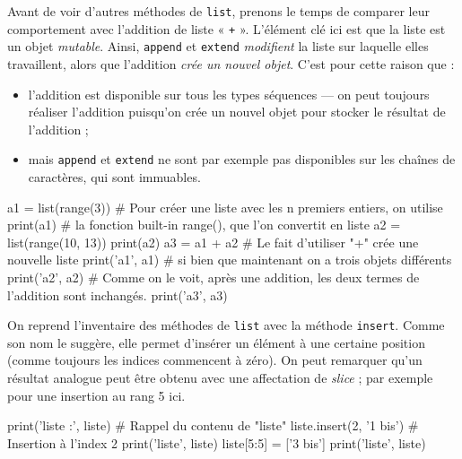 Avant de voir d'autres méthodes de \texttt{list}, prenons le temps de comparer leur comportement avec l'addition de liste « \texttt{+} ». L'élément clé ici  est que la liste est un objet \emph{mutable}. Ainsi, \texttt{append} et \texttt{extend} \emph{modifient} la liste sur laquelle elles travaillent, alors que l'addition \emph{crée un nouvel objet}. C'est pour cette raison que :
\vspace{-1pt}
\begin{itemize}
\item l'addition est disponible sur tous les types séquences --- on peut toujours réaliser l'addition puisqu'on crée un nouvel objet pour stocker le résultat de l'addition ;
\item mais \texttt{append} et \texttt{extend} ne sont par exemple pas disponibles sur les chaînes de caractères, qui sont immuables.
\end{itemize}

\vspace{-1pt}

\begin{idleconsole*}
\begin{pyconsole}[][breaklines]
a1 = list(range(3)) # Pour créer une liste avec les n premiers entiers, on utilise
print(a1)           # la fonction built-in range(), que l'on convertit en liste
a2 = list(range(10, 13))
print(a2)
a3 = a1 + a2    # Le fait d'utiliser "+" crée une nouvelle liste
print('a1', a1) # si bien que maintenant on a trois objets différents
print('a2', a2) # Comme on le voit, après une addition, les deux termes de l'addition sont inchangés.
print('a3', a3)
\end{pyconsole}
\end{idleconsole*}

\vspace{-1pt}

On reprend l'inventaire des méthodes de \texttt{list} avec la méthode \texttt{insert}. Comme son nom le suggère, elle permet d'insérer un élément à une certaine position (comme toujours les indices commencent à zéro). On peut remarquer qu'un résultat analogue peut être obtenu avec une affectation de \textit{slice} ; par exemple pour une insertion au rang 5 ici.

\vspace{-1pt}

\begin{idleconsole}
\begin{pyconsole}
print('liste :', liste) # Rappel du contenu de "liste"
liste.insert(2, '1 bis') # Insertion à l'index 2
print('liste', liste)
liste[5:5] = ['3 bis']
print('liste', liste)
\end{pyconsole}
\end{idleconsole}

